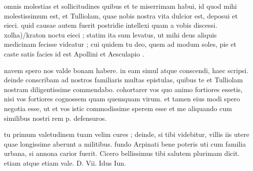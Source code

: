 


 omnis molestias et sollicitudines quibus et te miserrimam habui, id quod mihi molestissimum est, et Tulliolam, quae nobis nostra vita dulcior est, deposui et eieci. quid causae autem fuerit postridie intellexi quam a vobis discessi. xolh\n a)/kraton noctu eieci ; statim ita sum levatus, ut mihi deus aliquis medicinam fecisse videatur ; cui quidem tu deo, quem ad modum soles, pie et caste satis facies id est Apollini et Aesculapio .

 navem spero nos valde bonam habere. in eam simul atque conscendi, haec scripsi. deinde conscribam ad nostros familiaris multas epistulas, quibus te et Tulliolam nostram diligentissime commendabo. cohortarer vos quo animo fortiores essetis, nisi vos fortiores cognossem quam quemquam virum. et tamen eius modi spero negotia esse, ut et vos istic commodissime sperem esse et me aliquando cum similibus nostri rem p. defensuros.

 tu primum valetudinem tuam velim cures ; deinde, si tibi videbitur, villis iis utere quae longissime aberunt a militibus. fundo Arpinati bene poteris uti cum familia urbana, si annona carior fuerit. Cicero bellissimus tibi salutem plurimam dicit. etiam atque etiam vale. D. Vii. Idus Iun.
